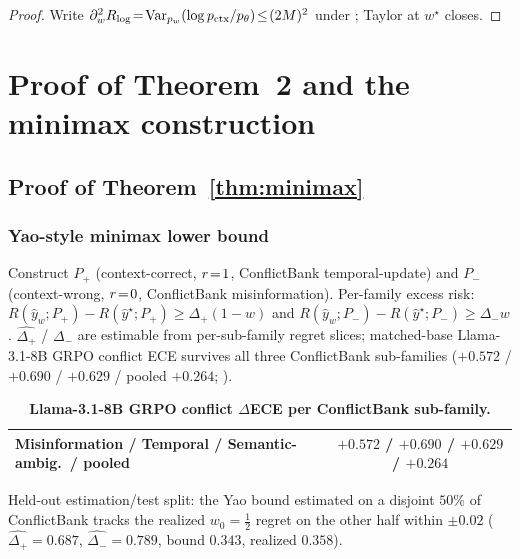 \begin{proof}
Write
$\partial_w^2 R_{\log}\!=\!\operatorname{Var}_{p_w}(\log p_{\mathrm{ctx}}/p_\theta)\!\le\!(2M)^2$
under ; Taylor at $w^\star$ closes.
\end{proof}



\section{Proof of Theorem~2 and the minimax construction}
\label{app:letter-D}

\subsection{Proof of Theorem~\ref{thm:minimax}}
\label{app:thm2}

\subsubsection{Yao-style minimax lower bound}
\label{app:thm2-yao}

Construct $P_+$ (context-correct, $r\!=\!1$, ConflictBank
temporal-update) and $P_-$ (context-wrong, $r\!=\!0$,
ConflictBank misinformation).  Per-family excess risk:
$R(\hat y_w;P_+)\!-\!R(\hat y^\star;P_+)\!\ge\!\Delta_+(1\!-\!w)$
and $R(\hat y_w;P_-)\!-\!R(\hat y^\star;P_-)\!\ge\!\Delta_- w$.
$\widehat{\Delta_+}$ / $\widehat{\Delta_-}$ are estimable from
per-sub-family regret slices; matched-base Llama-3.1-8B GRPO
conflict ECE survives all three ConflictBank sub-families
($+0.572$ / $+0.690$ / $+0.629$ / pooled $+0.264$;
).

\begin{table}[H]
\centering\small
\setlength{\tabcolsep}{6pt}
\caption{\textbf{Llama-3.1-8B GRPO conflict $\Delta$ECE per ConflictBank sub-family.}}
\label{tab:grpo-subfamily-survival}
\begin{tabular}{lc}
\toprule
Misinformation / Temporal / Semantic-ambig.\ / pooled
& $+0.572$ / $+0.690$ / $+0.629$ / $+0.264$\\
\bottomrule
\end{tabular}
\end{table}

Held-out estimation/test split: the Yao bound estimated on a
disjoint $50\%$ of ConflictBank tracks the realized
$w_0\!=\!\tfrac12$ regret on the other half within
$\pm 0.02$ ($\widehat{\Delta_+}\!=\!0.687$, $\widehat{\Delta_-}\!=\!0.789$,
bound $0.343$, realized $0.358$).

